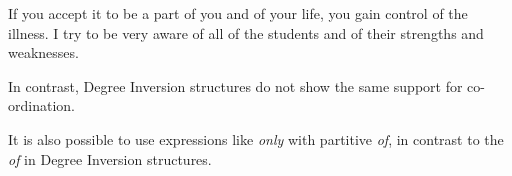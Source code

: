 \documentclass[output=paper,
modfonts
]{LSP/langsci}
\begin{document}
\begin{exe}
\ex\label{ex9h}
\begin{xlist}
\ex If you accept it to be a part of you and of your life, you gain control of the illness.
\ex I try to be very aware of all of the students and of their strengths and weaknesses.
 \end{xlist}
\end{exe}
In contrast, Degree Inversion structures do not show the same support for co-ordination.
\begin{exe}
\ex\label{ex9i}  
\begin{xlist}
\end{xlist}
\end{exe}
It is also possible to use expressions like {\textit{only}} with partitive {\textit{of}}, in contrast to the {\textit{of}} in Degree Inversion structures.
\begin{exe}
\ex\label{ex9j}  
\begin{xlist}
\end{xlist}
\end{exe}
\end{document}

